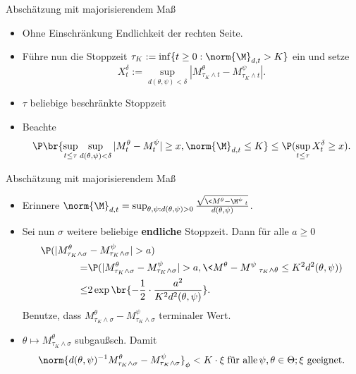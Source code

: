 \begin{frame}{Abschätzung mit majorisierendem Maß}
    \begin{proofs}
        \begin{itemize}
            \item Ohne Einschränkung Endlichkeit der rechten Seite.
            \item Führe nun die Stoppzeit $\tau_K := \inf\{t \geq 0: \norm{\M}_{d,t} > K\}$ ein und setze \[
    X_t^\delta := \sup_{d(\theta, \psi) < \delta} |M_{\tau_K \wedge t}^\theta - M_{\tau_K \wedge t}^\psi|.
            \]
            \item $\tau$ beliebige beschränkte Stoppzeit
            \item  Beachte \[\P\br{\sup_{t \leq \tau} \sup_{d(\theta, \psi) < \delta} |M_t^\theta - M_t^\psi| \geq x, \norm{\M}_{d,t} \leq K} \leq \P(\sup_{t \leq \tau} X_t^\delta \geq x).\]
        \end{itemize}
    \end{proofs}
\end{frame}

\begin{frame}{Abschätzung mit majorisierendem Maß}
    \begin{proofs}
        \begin{itemize}
            \item Erinnere $\norm{\M}_{d,t}  = \sup_{\theta, \psi: d(\theta, \psi) > 0} \frac{\sqrt{\<M^\theta - \M^\psi\>_t}}{d(\theta, \psi)}$.
            \item Sei nun $\sigma$ weitere beliebige \textbf{endliche} Stoppzeit. Dann für alle $a \geq 0$\begin{align*}
                \P(|M_{\tau_K\wedge\sigma}^\theta& - M_{\tau_K \wedge \sigma}^\psi| > a) \\
                =& \P(|M_{\tau_K\wedge\sigma}^\theta - M_{\tau_K \wedge \sigma}^\psi| > a, \<M^\theta - M^\psi\>_{\tau_K \wedge \theta} \leq K^2d^2(\theta, \psi)) \\
                \leq&2\exp\br{-\frac{1}{2}\cdot \frac{a^2}{K^2d^2(\theta, \psi)}}.
            \end{align*} Benutze, dass $M_{\tau_K \wedge \sigma}^\theta - M_{\tau_K \wedge \sigma}^\psi$ terminaler Wert.
            \item $\theta \mapsto M_{\tau_K \wedge \sigma}^\theta$ subgaußsch. Damit \[\norm{d(\theta, \psi)^{-1} M_{\tau_K \wedge \sigma}^\theta - M_{\tau_K \wedge \sigma}^\psi}_\phi < K \cdot \xi \;\text{für alle}\,\psi, \theta \in \Theta; \xi \text{ geeignet.}\] 
        \end{itemize}
    \end{proofs}
\end{frame}

